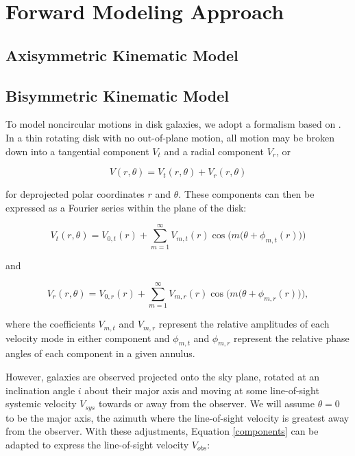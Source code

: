 \section{Forward Modeling Approach}
\label{sec:modeling}

\subsection{Axisymmetric Kinematic Model} \label{sec:axisym}


\subsection{Bisymmetric Kinematic Model} \label{sec:bisym}
To model noncircular motions in disk galaxies, we adopt a formalism based on \cite{spekkens07}. In a thin rotating disk with no out-of-plane motion, all motion may be broken down into a tangential component $V_t$ and a radial component $V_r$, or

\begin{equation} \label{components}
    V(r,\theta) = V_t(r,\theta) + V_r(r,\theta)
\end{equation}

\noindent for deprojected polar coordinates $r$ and $\theta$. These components can then be expressed as a Fourier series within the plane of the disk:

\begin{equation}
    V_t(r, \theta) = V_{0,t}(r) + \sum_{m=1}^\infty V_{m,t}(r) \cos \bigg( m \big(\theta + \phi_{m,t}(r) \big) \bigg)
\end{equation}

and

\begin{equation}
    V_r(r, \theta) = V_{0,r}(r) + \sum_{m=1}^\infty V_{m,r}(r) \cos \bigg( m \big(\theta + \phi_{m,r}(r) \big) \bigg),
\end{equation}

\noindent where the coefficients $V_{m,t}$ and $V_{m,r}$ represent the relative amplitudes of each velocity mode in either component and $\phi_{m,t}$ and $\phi_{m,r}$ represent the relative phase angles of each component in a given annulus. 

However, galaxies are observed projected onto the sky plane, rotated at an inclination angle $i$ about their major axis and moving at some line-of-sight systemic velocity $V_{sys}$ towards or away from the observer. We will assume $\theta=0$ to be the major axis, the azimuth where the line-of-sight velocity is greatest away from the observer. With these adjustments, Equation \ref{components} can be adapted to express the line-of-sight velocity $V_{obs}$:

